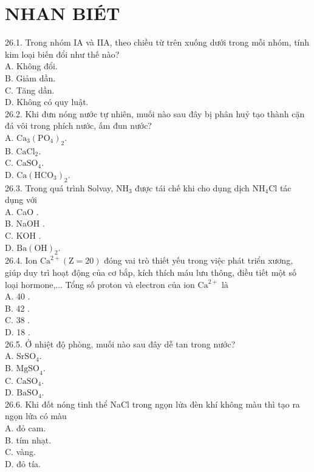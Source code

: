 \documentclass[10pt]{article}
\begin{document}
\section*{NHAN BIÉT}
26.1. Trong nhóm IA và IIA, theo chiều từ trên xuống dưới trong mỗi nhóm, tính kim loại biến đổi như thế nào?\\
A. Không đổi.\\
B. Giảm dần.\\
C. Tăng dần.\\
D. Không có quy luật.\\
26.2. Khi đưn nóng nước tự nhiên, muối nào sau đây bị phân huỷ tạo thành cặn đá vôi trong phích nước, ấm đun nước?\\
A. $\mathrm{Ca}_{3}\left(\mathrm{PO}_{4}\right)_{2}$.\\
B. $\mathrm{CaCl}_{2}$.\\
C. $\mathrm{CaSO}_{4}$.\\
D. $\mathrm{Ca}\left(\mathrm{HCO}_{3}\right)_{2}$.\\
26.3. Trong quá trình Solvay, $\mathrm{NH}_{3}$ được tái chế khi cho dụng dịch $\mathrm{NH}_{4} \mathrm{Cl}$ tác dụng với\\
A. CaO .\\
B. NaOH .\\
C. KOH .\\
D. $\mathrm{Ba}(\mathrm{OH})_{2}$.\\
26.4. Ion $\mathrm{Ca}^{2+}(\mathrm{Z}=20)$ đóng vai trò thiết yếu trong việc phát triển xương, giúp duy trì hoạt động của cơ bắp, kích thích máu lưu thông, điều tiết một số loại hormone,... Tổng số proton và electron của ion $\mathrm{Ca}^{2+}$ là\\
A. 40 .\\
B. 42 .\\
C. 38 .\\
D. 18 .\\
26.5. Ở nhiệt độ phòng, muối nào sau đây dễ tan trong nước?\\
A. $\mathrm{SrSO}_{4}$.\\
B. $\mathrm{MgSO}_{4}$.\\
C. $\mathrm{CaSO}_{4}$.\\
D. $\mathrm{BaSO}_{4}$.\\
26.6. Khi đốt nóng tinh thể NaCl trong ngọn lửa đèn khí không màu thì tạo ra ngọn lửa có màu\\
A. đỏ cam.\\
B. tím nhạt.\\
C. vàng.\\
D. đỏ tía.\\
\end{document}
